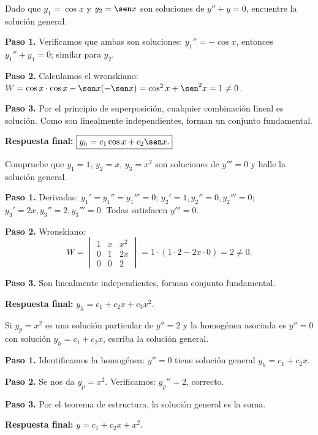 \begin{example}
Dado que $y_1 = \cos x$ y $y_2 = \sen x$ son soluciones de $y'' + y = 0$, encuentre la solución general.

\begin{myproof}
\textbf{Paso 1.} Verificamos que ambas son soluciones: $y_1'' = -\cos x$, entonces $y_1''+y_1=0$; similar para $y_2$.

\textbf{Paso 2.} Calculamos el wronskiano:
$W = \cos x \cdot \cos x - \sen x (-\sen x) = \cos^2 x + \sen^2 x = 1 \neq 0$.

\textbf{Paso 3.} Por el principio de superposición, cualquier combinación lineal es solución. Como son linealmente independientes, forman un conjunto fundamental.

\textbf{Respuesta final:} $\boxed{y_h = c_1 \cos x + c_2 \sen x.}$
\end{myproof}
\end{example}

\begin{example}
Compruebe que $y_1 = 1$, $y_2 = x$, $y_3 = x^2$ son soluciones de $y''' = 0$ y halle la solución general.

\begin{myproof}
\textbf{Paso 1.} Derivadas: $y_1'=y_1''=y_1'''=0$; $y_2'=1, y_2''=0, y_2'''=0$; $y_3'=2x, y_3''=2, y_3'''=0$. Todas satisfacen $y'''=0$.

\textbf{Paso 2.} Wronskiano:
\[
W = \begin{vmatrix}
1 & x & x^2 \\
0 & 1 & 2x \\
0 & 0 & 2
\end{vmatrix} = 1 \cdot (1\cdot 2 - 2x\cdot 0) = 2 \neq 0.
\]

\textbf{Paso 3.} Son linealmente independientes, forman conjunto fundamental.

\textbf{Respuesta final:} $\boxed{y_h = c_1 + c_2 x + c_3 x^2.}$
\end{myproof}
\end{example}

\begin{example}
Si $y_p = x^2$ es una solución particular de $y'' = 2$ y la homogénea asociada es $y''=0$ con solución $y_h = c_1 + c_2 x$, escriba la solución general.

\begin{myproof}
\textbf{Paso 1.} Identificamos la homogénea: $y''=0$ tiene solución general $y_h = c_1 + c_2 x$.

\textbf{Paso 2.} Se nos da $y_p = x^2$. Verificamos: $y_p'' = 2$, correcto.

\textbf{Paso 3.} Por el teorema de estructura, la solución general es la suma.

\textbf{Respuesta final:} $\boxed{y = c_1 + c_2 x + x^2.}$
\end{myproof}
\end{example}


